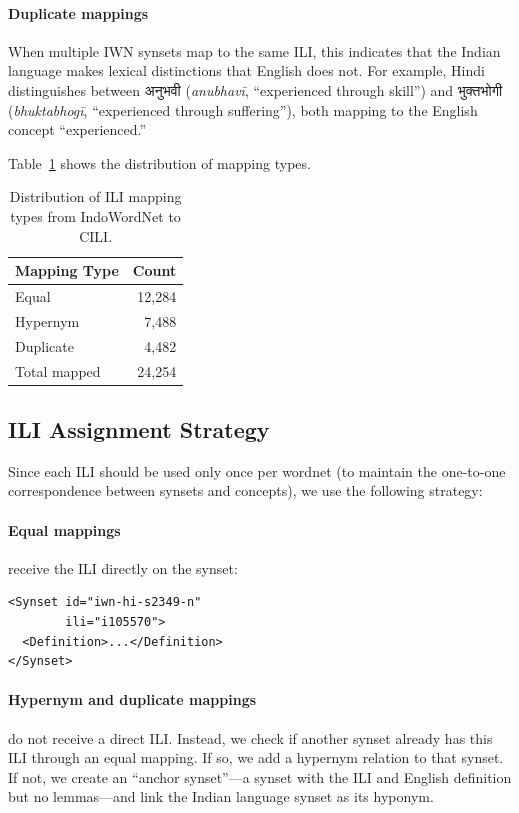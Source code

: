 \documentclass[11pt]{article}
\begin{document}
\paragraph{Duplicate mappings}
When multiple IWN synsets map to the same ILI, this indicates that the Indian language makes lexical distinctions that English does not.
For example, Hindi distinguishes between अनुभवी (\textit{anubhavī}, ``experienced through skill'') and भुक्तभोगी (\textit{bhuktabhogī}, ``experienced through suffering''), both mapping to the English concept ``experienced.''

Table~\ref{tab:mapping-stats} shows the distribution of mapping types.

\begin{table}[t]
\centering
\begin{tabular}{lr}
\toprule
\textbf{Mapping Type} & \textbf{Count} \\
\midrule
Equal & 12,284 \\
Hypernym & 7,488 \\
Duplicate & 4,482 \\
\midrule
Total mapped & 24,254 \\
\bottomrule
\end{tabular}
\caption{Distribution of ILI mapping types from IndoWordNet to CILI.}
\label{tab:mapping-stats}
\end{table}

\subsection{ILI Assignment Strategy}

Since each ILI should be used only once per wordnet (to maintain the one-to-one correspondence between synsets and concepts), we use the following strategy:

\paragraph{Equal mappings} receive the ILI directly on the synset:
\begin{verbatim}
<Synset id="iwn-hi-s2349-n" 
        ili="i105570">
  <Definition>...</Definition>
</Synset>
\end{verbatim}

\paragraph{Hypernym and duplicate mappings} do not receive a direct ILI.
Instead, we check if another synset already has this ILI through an equal mapping.
If so, we add a hypernym relation to that synset.
If not, we create an ``anchor synset''---a synset with the ILI and English definition but no lemmas---and link the Indian language synset as its hyponym.
\end{document}
